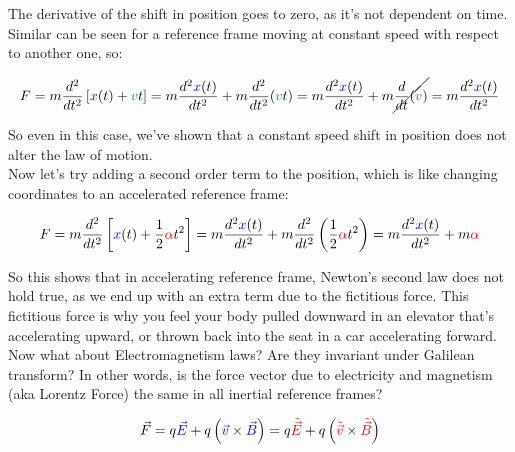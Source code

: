 The derivative of the shift in position goes to zero, as it's not dependent on time. Similar can be seen for a reference frame moving at constant speed with respect to another one, so:

\begin{align*}
    F = m \frac{d^2}{dt^2}\left[\begingroup\color{blue}x\endgroup(t) + \begingroup\color{teal}v\endgroup t\right] = m \frac{d^2 \begingroup\color{blue}x\endgroup(t)}{dt^2} + m \frac{d^2}{dt^2}(\begingroup\color{teal}v\endgroup t) = m \frac{d^2 \begingroup\color{blue}x\endgroup(t)}{dt^2} + m \cancel{\frac{d}{dt}(\begingroup\color{teal}v\endgroup)} = m \frac{d^2 \begingroup\color{blue}x\endgroup(t)}{dt^2}
\end{align*}

So even in this case, we've shown that a constant speed shift in position does not alter the law of motion.\\

Now let's try adding a second order term to the position, which is like changing coordinates to an accelerated reference frame:

\begin{align*}
    F = m \frac{d^2}{dt^2}\left[\begingroup\color{blue}x\endgroup(t) + \frac{1}{2}\begingroup\color{red}\alpha\endgroup t^2\right] = m \frac{d^2 \begingroup\color{blue}x\endgroup(t)}{dt^2} + m \frac{d^2}{dt^2}\left(\frac{1}{2}\begingroup\color{red}\alpha\endgroup t^2\right) = m \frac{d^2 \begingroup\color{blue}x\endgroup(t)}{dt^2} + m \begingroup\color{red}\alpha\endgroup
\end{align*}

So this shows that in accelerating reference frame, Newton's second law does not hold true, as we end up with an extra term due to the fictitious force. This fictitious force is why 
you feel your body pulled downward in an elevator that's accelerating upward, or thrown back into the seat in a car accelerating forward.\\

Now what about Electromagnetism laws? Are they invariant under Galilean transform? In other words, is the force vector due to electricity and magnetism (aka Lorentz Force)
the same in all inertial reference frames?

\begin{equation}
    \vec{F} = q\begingroup\color{blue}\vec{E}\endgroup + q\left(\begingroup\color{blue}\vec{v}\endgroup \times \begingroup\color{blue}\vec{B}\endgroup\right) = q\begingroup\color{red}\tilde{\vec{E}}\endgroup + q\left(\begingroup\color{red}\tilde{\vec{v}}\endgroup \times \begingroup\color{red}\tilde{\vec{B}}\endgroup\right)
\end{equation}

